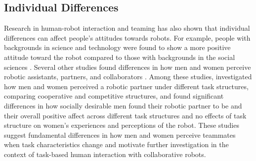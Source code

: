 \subsection{Individual Differences}
Research in human-robot interaction and teaming has also shown that individual differences can affect people's attitudes towards robots. For example, people with backgrounds in science and technology were found to show a more positive attitude toward the robot compared to those with backgrounds in the social sciences \cite{nomura2011exploring}. Several other studies found differences in how men and women perceive robotic assistants, partners, and collaborators \cite{mutlu2006storytelling,schermerhorn2008robot,takayama2009influences}. Among these studies, \citet{mutlu2006task} investigated how men and women perceived a robotic partner under different task structures, comparing cooperative and competitive structures, and found significant differences in how socially desirable men found their robotic partner to be and their overall positive affect across different task structures and no effects of task structure on women's experiences and perceptions of the robot. These studies suggest fundamental differences in how men and women perceive teammates when task characteristics change and motivate further investigation in the context of task-based human interaction with collaborative robots.